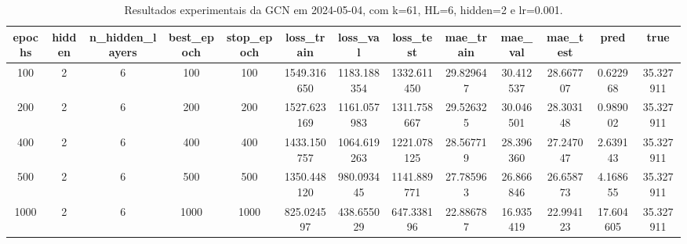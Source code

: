 \begin{table}[h]
\centering
\caption{Resultados experimentais da GCN em 2024-05-04, com k=61, HL=6, hidden=2 e lr=0.001.}
\label{tab:gcn_results_k61_hl6_h2_d20240504}
\begin{tabular}{ccccccccccccc}
\toprule
epochs & hidden & n\_hidden\_layers & best\_epoch & stop\_epoch & loss\_train & loss\_val & loss\_test & mae\_train & mae\_val & mae\_test & pred & true \\
\midrule
100 & 2 & 6 & 100 & 100 & 1549.316650 & 1183.188354 & 1332.611450 & 29.829647 & 30.412537 & 28.667707 & 0.622968 & 35.327911 \\
200 & 2 & 6 & 200 & 200 & 1527.623169 & 1161.057983 & 1311.758667 & 29.526325 & 30.046501 & 28.303148 & 0.989002 & 35.327911 \\
400 & 2 & 6 & 400 & 400 & 1433.150757 & 1064.619263 & 1221.078125 & 28.567719 & 28.396360 & 27.247047 & 2.639143 & 35.327911 \\
500 & 2 & 6 & 500 & 500 & 1350.448120 & 980.093445 & 1141.889771 & 27.785963 & 26.866846 & 26.658773 & 4.168655 & 35.327911 \\
1000 & 2 & 6 & 1000 & 1000 & 825.024597 & 438.655029 & 647.338196 & 22.886787 & 16.935419 & 22.994123 & 17.604605 & 35.327911 \\
\bottomrule
\end{tabular}
\end{table}
